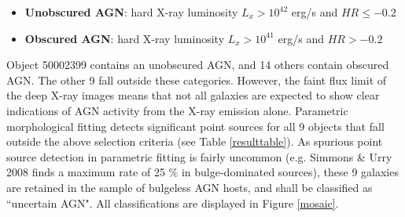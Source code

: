 \documentclass[11pt,twocolumn]{article}
\begin{document}
\begin{itemize}
\item{\textbf{Unobscured AGN}: hard X-ray luminosity $L_{x} > 10^{42}$ erg/s and $HR \leq -0.2$} 
\item{\textbf{Obscured AGN}: hard X-ray luminosity $L_{x} > 10^{41}$ erg/s and $HR > -0.2$}
\end{itemize}

Object 50002399 contains an unobscured AGN, and 14 others contain obscured AGN. The other 9 fall outside these categories. However, the faint flux limit of the deep X-ray images means that not all galaxies are expected to show clear indications of AGN activity from the X-ray emission alone. Parametric morphological fitting detects significant point sources for all 9 objects that fall outside the above selection criteria (see Table \ref{resulttable}). As spurious point source detection in parametric fitting is fairly uncommon (e.g. Simmons \& Urry 2008 \cite{2008ApJ...683..644S} finds a maximum rate of 25 \% in bulge-dominated sources), these 9 galaxies are retained in the sample of bulgeless AGN hosts, and shall be classified as ``uncertain AGN". All classifications are displayed in Figure \ref{mosaic}. 







% 
\end{document}
